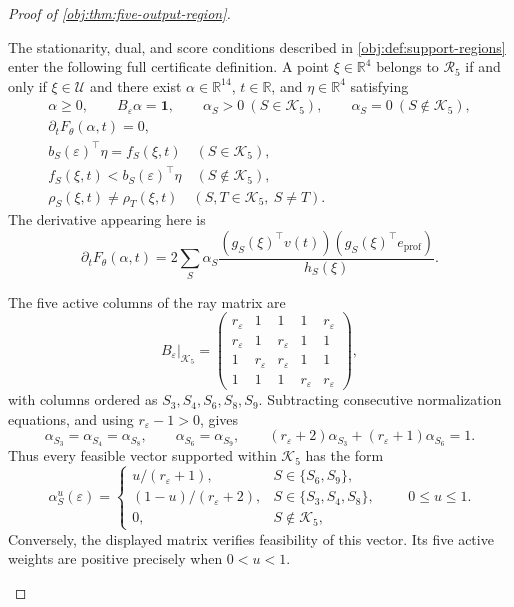 \documentclass[11pt]{article}
\begin{document}
\begin{proof}[Proof of \cref{obj:thm:five-output-region}]
\begin{enumerate}
The stationarity, dual, and score conditions described in
\cref{obj:def:support-regions} enter the following full certificate definition.
A point \(\xi\in\mathbb R^4\) belongs to \(\mathcal R_5\) if and only if
\(\xi\in\mathcal U\) and there exist
\(\alpha\in\mathbb R^{14}\), \(t\in\mathbb R\), and \(\eta\in\mathbb R^4\) satisfying
\[
\begin{gathered}
\alpha\ge0,\qquad B_\varepsilon\alpha=\mathbf1,\qquad
\alpha_S>0\ (S\in\mathcal K_5),\qquad
\alpha_S=0\ (S\notin\mathcal K_5),\\
\partial_tF_\theta(\alpha,t)=0,\\
b_S(\varepsilon)^\top\eta=f_S(\xi,t)\quad(S\in\mathcal K_5),\\
f_S(\xi,t)<b_S(\varepsilon)^\top\eta\quad(S\notin\mathcal K_5),\\
\rho_S(\xi,t)\ne\rho_T(\xi,t)
\quad(S,T\in\mathcal K_5,\ S\ne T).
\end{gathered}
\]
The derivative appearing here is
\[
\partial_tF_\theta(\alpha,t)
=
2\sum_S\alpha_S
\frac{(g_S(\xi)^\top v(t))(g_S(\xi)^\top e_{\mathrm{prof}})}
     {h_S(\xi)}.
\]

The five active columns of the ray matrix are
\[
B_\varepsilon\big|_{\mathcal K_5}
=
\begin{pmatrix}
r_\varepsilon&1&1&1&r_\varepsilon\\
r_\varepsilon&1&r_\varepsilon&1&1\\
1&r_\varepsilon&r_\varepsilon&1&1\\
1&1&1&r_\varepsilon&r_\varepsilon
\end{pmatrix},
\]
with columns ordered as \(S_3,S_4,S_6,S_8,S_9\).
Subtracting consecutive normalization equations, and using
\(r_\varepsilon-1>0\), gives
\[
\alpha_{S_3}=\alpha_{S_4}=\alpha_{S_8},\qquad
\alpha_{S_6}=\alpha_{S_9},\qquad
(r_\varepsilon+2)\alpha_{S_3}
+(r_\varepsilon+1)\alpha_{S_6}=1.
\]
Thus every feasible vector supported within \(\mathcal K_5\) has the form
\[
\alpha^u_S(\varepsilon)=
\begin{cases}
u/(r_\varepsilon+1),&S\in\{S_6,S_9\},\\
(1-u)/(r_\varepsilon+2),&S\in\{S_3,S_4,S_8\},\\
0,&S\notin\mathcal K_5,
\end{cases}
\qquad 0\le u\le1.
\]
Conversely, the displayed matrix verifies feasibility of this vector.
Its five active weights are positive precisely when \(0<u<1\).


\end{enumerate}
\end{proof}
\end{document}
